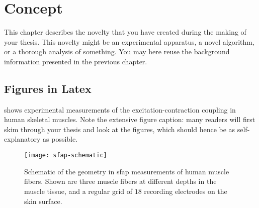 \chapter{Concept}
\label{chap:concept}

This chapter describes the novelty that you have created during the making of your thesis.
This novelty might be an experimental apparatus, a novel algorithm, or a thorough analysis of something.
You may here reuse the background information presented in the previous chapter.

\section{Figures in Latex}
 shows experimental measurements of the excitation-contraction coupling in human skeletal muscles.
Note the extensive figure caption: many readers will first skim through your thesis and look at the figures, which should hence be as self-explanatory as possible.
\begin{figure}
  \centering
  \texttt{[image: sfap-schematic]}
  \caption[Geometry of Single Fiber Action Potential (SFAP) measurements]{Schematic of the geometry in \acrfull{sfap} measurements of human muscle fibers. Shown are three muscle fibers at different depths in the muscle tissue, and a regular grid of $18$ recording electrodes on the skin surface.}
  \label{fig:sfap-schematic}
\end{figure}

